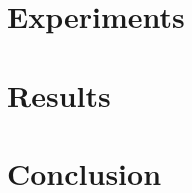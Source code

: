 \documentclass{article}
\begin{document}
\section{Experiments}





\section{Results}

\section{Conclusion}





\end{document}
